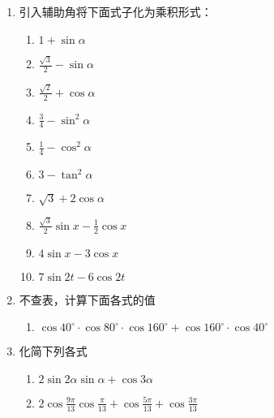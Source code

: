 \begin{enumerate}
    \item 引入辅助角将下面式子化为乘积形式：
    \begin{multicols}{2}
\begin{enumerate}
\item $1+\sin \alpha$
\item $\frac{\sqrt{3}}{2}-\sin \alpha$
\item $\frac{\sqrt{2}}{2}+\cos \alpha$
\item $\frac{3}{4}-\sin ^{2} \alpha$
\item $\frac{1}{4}-\cos ^{2} \alpha$
\item $3-\tan^{2} \alpha$
\item $\sqrt{3}+2 \cos \alpha$
\item $\frac{\sqrt{3}}{2} \sin x-\frac{1}{2} \cos x$
\item $4 \sin x-3 \cos x$
\item $7 \sin 2 t-6 \cos 2 t$
\end{enumerate}
\end{multicols}

\item 不查表，计算下面各式的值
\begin{enumerate}
\item  $\cos 40^{\circ} \cdot \cos 80^{\circ} \cdot \cos 160^{\circ}+\cos 160^{\circ} \cdot \cos 40^{\circ}$  
\end{enumerate}

\item 化简下列各式
\begin{enumerate}
\item $2 \sin 2 \alpha \sin \alpha+\cos 3 \alpha$
\item $2 \cos \frac{9 \pi}{13} \cos \frac{\pi}{13}+\cos \frac{5 \pi}{13}+\cos \frac{3 \pi}{13}$
\end{enumerate}



\end{enumerate}
